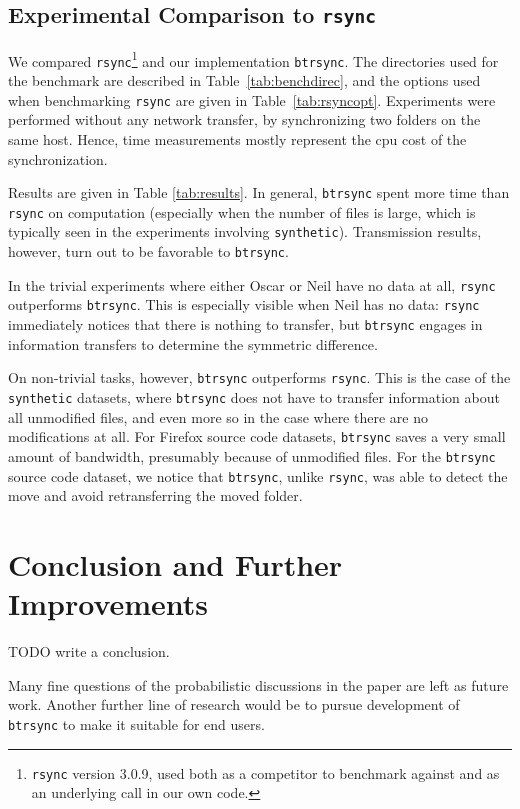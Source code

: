 \documentclass[11pt]{llncs}
\newcommand{\btrsync}{\texttt{btrsync}\xspace}
\newcommand{\rsync}{\texttt{rsync}\xspace}
\newcommand{\comm}[1]{\marginpar{%
\vskip-\baselineskip %
\raggedright\footnotesize
\itshape\hrule\smallskip#1\par\smallskip\hrule}}
\begin{document}
\subsection{Experimental Comparison to \rsync}

We compared \rsync\footnote{\rsync version 3.0.9, used both as a competitor to
benchmark against and as an underlying call in our own code.} and our implementation \btrsync. The directories used for the
benchmark are described in Table~\ref{tab:benchdirec}, and the options used
when benchmarking \rsync are given in Table~\ref{tab:rsyncopt}. Experiments
were performed without any network transfer, by synchronizing two folders on
the same host. Hence, time measurements mostly represent the {\sc cpu} cost of
the synchronization.

Results are given in Table \ref{tab:results}. In general, \btrsync spent more time than \rsync on computation (especially when the number of files is large, which is typically seen in the experiments involving {\tt synthetic}). Transmission results, however, turn out to be favorable to \btrsync.

In the trivial experiments where either Oscar or Neil have no data at all, \rsync outperforms \btrsync. This is especially visible when Neil has no data: \rsync immediately notices that there is nothing to transfer, but \btrsync engages in information transfers to determine the symmetric
difference.

On non-trivial tasks, however, \btrsync outperforms \rsync. This is the case of the {\tt synthetic} datasets, where \btrsync does not have to transfer
information about all unmodified files, and even more so in the case where there are no modifications at all. For Firefox source code datasets, \btrsync saves a very small amount of bandwidth, presumably because of unmodified files. For the \btrsync source code dataset, we notice that \btrsync, unlike \rsync, was able to detect the move and avoid retransferring the moved folder.

\section{Conclusion and Further Improvements}

TODO write a conclusion.

Many fine questions of the probabilistic discussions in the paper are left as future work.\comm{Be more specific!} Another further line of research would be to pursue development of \btrsync to make it suitable for end users.
\end{document}
